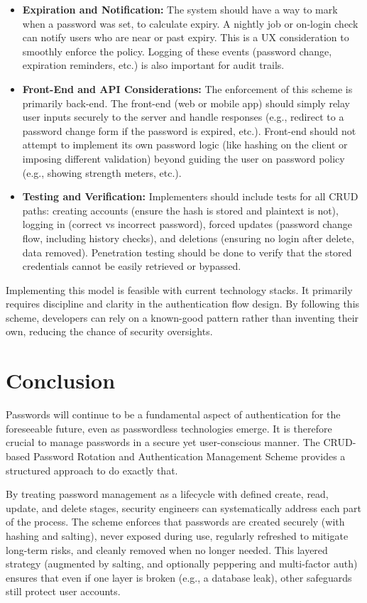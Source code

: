 \documentclass[11pt]{article}
\begin{document}
\begin{itemize}
    \item \textbf{Expiration and Notification:} The system should have a way to mark when a password was set, to calculate expiry. A nightly job or on-login check can notify users who are near or past expiry. This is a UX consideration to smoothly enforce the policy. Logging of these events (password change, expiration reminders, etc.) is also important for audit trails.
    \item \textbf{Front-End and API Considerations:} The enforcement of this scheme is primarily back-end. The front-end (web or mobile app) should simply relay user inputs securely to the server and handle responses (e.g., redirect to a password change form if the password is expired, etc.). Front-end should not attempt to implement its own password logic (like hashing on the client or imposing different validation) beyond guiding the user on password policy (e.g., showing strength meters, etc.).
    \item \textbf{Testing and Verification:} Implementers should include tests for all CRUD paths: creating accounts (ensure the hash is stored and plaintext is not), logging in (correct vs incorrect password), forced updates (password change flow, including history checks), and deletions (ensuring no login after delete, data removed). Penetration testing should be done to verify that the stored credentials cannot be easily retrieved or bypassed.
\end{itemize}

Implementing this model is feasible with current technology stacks. It primarily requires discipline and clarity in the authentication flow design. By following this scheme, developers can rely on a known-good pattern rather than inventing their own, reducing the chance of security oversights.

\section{Conclusion}
Passwords will continue to be a fundamental aspect of authentication for the foreseeable future, even as passwordless technologies emerge. It is therefore crucial to manage passwords in a secure yet user-conscious manner. The CRUD-based Password Rotation and Authentication Management Scheme provides a structured approach to do exactly that. 

By treating password management as a lifecycle with defined create, read, update, and delete stages, security engineers can systematically address each part of the process. The scheme enforces that passwords are created securely (with hashing and salting), never exposed during use, regularly refreshed to mitigate long-term risks, and cleanly removed when no longer needed. This layered strategy (augmented by salting, and optionally peppering and multi-factor auth) ensures that even if one layer is broken (e.g., a database leak), other safeguards still protect user accounts.
\end{document}
